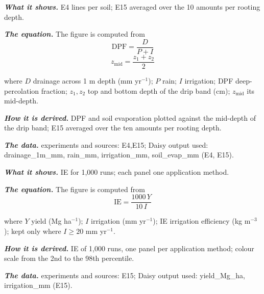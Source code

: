 \label{fig:a19_19}
\par\noindent\textbf{\color{khmag}\emph{What it shows.}} E4 lines per soil; E15 averaged over the 10 amounts per rooting depth.
\par\noindent\textbf{\color{khmag}\emph{The equation.}} The figure is computed from
\begin{equation}\boxed{\mathrm{DPF}=\dfrac{D}{P+I}}\end{equation}
\begin{equation}\boxed{z_{\mathrm{mid}}=\dfrac{z_1+z_2}2}\end{equation}
\par\noindent where $D$ drainage across 1 m depth (mm yr$^{-1}$); $P$ rain; $I$ irrigation; DPF deep-percolation fraction; $z_1,z_2$ top and bottom depth of the drip band (cm); $z_{\mathrm{mid}}$ its mid-depth.
\par\noindent\textbf{\color{khmag}\emph{How it is derived.}} DPF and soil evaporation plotted against the mid-depth of the drip band; E15 averaged over the ten amounts per rooting depth.
\par\noindent\textbf{\color{khmag}\emph{The data.}} experiments and sources: E4,E15; Daisy output used: drainage\_1m\_mm, rain\_mm, irrigation\_mm, soil\_evap\_mm (E4, E15).
\par\vspace{6pt}\noindent{}\par\nobreak
{}\label{fig:a19_20}
\par\noindent\textbf{\color{khmag}\emph{What it shows.}} IE for 1,000 runs; each panel one application method.
\par\noindent\textbf{\color{khmag}\emph{The equation.}} The figure is computed from
\begin{equation}\boxed{\mathrm{IE}=\dfrac{1000\,Y}{10\,I}}\end{equation}
\par\noindent where $Y$ yield (Mg ha$^{-1}$); $I$ irrigation (mm yr$^{-1}$); IE irrigation efficiency (kg m$^{-3}$); kept only where $I\ge 20$ mm yr$^{-1}$.
\par\noindent\textbf{\color{khmag}\emph{How it is derived.}} IE of 1,000 runs, one panel per application method; colour scale from the 2nd to the 98th percentile.
\par\noindent\textbf{\color{khmag}\emph{The data.}} experiments and sources: E15; Daisy output used: yield\_Mg\_ha, irrigation\_mm (E15).
